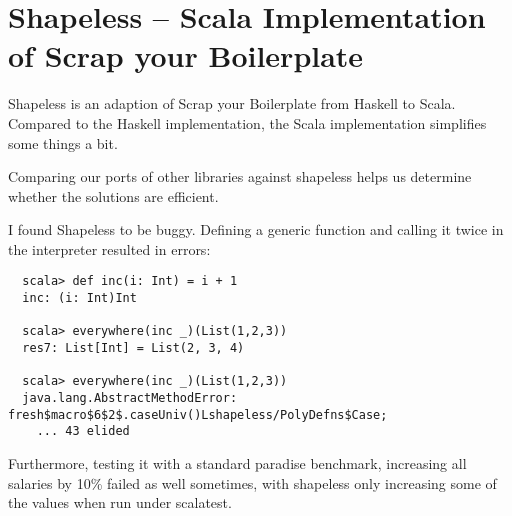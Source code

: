 \section{Shapeless -- Scala Implementation of Scrap your Boilerplate}

Shapeless is an adaption of Scrap your Boilerplate\cite{DBLP:conf/tldi/LammelJ03}
from Haskell to Scala. Compared to the Haskell implementation, the Scala
implementation simplifies some things a bit.

Comparing our ports of other libraries against shapeless helps us determine
whether the solutions are efficient.

I found Shapeless to be buggy. Defining a generic function and calling
it twice in the interpreter resulted in errors:
\begin{lstlisting}
  scala> def inc(i: Int) = i + 1
  inc: (i: Int)Int

  scala> everywhere(inc _)(List(1,2,3))
  res7: List[Int] = List(2, 3, 4)

  scala> everywhere(inc _)(List(1,2,3))
  java.lang.AbstractMethodError: fresh$macro$6$2$.caseUniv()Lshapeless/PolyDefns$Case;
    ... 43 elided
\end{lstlisting}

Furthermore, testing it with a standard paradise benchmark, increasing all
salaries by 10\% failed as well sometimes, with shapeless only increasing
some of the values when run under scalatest.
